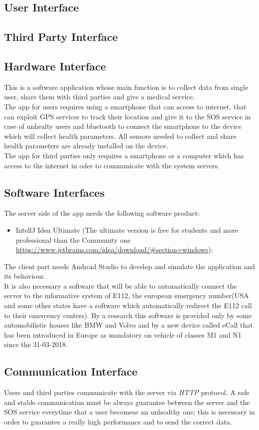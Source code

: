 \subsection{User Interface}


\subsection{Third Party Interface}


\subsection{Hardware Interface}
This is a software application whose main function is to collect data from single user, share them with third parties and give a medical service.\\
The app for users requires using a smartphone that can access to internet, that can exploit GPS services to track their location and give it to the SOS service in case of unhealty users and bluetooth to connect the smartphone to the device which will collect health parameters.
All sensors needed to collect and share health parameters are already installed on the device.\\
The app for third parties only requires a smartphone or a computer which has access to the internet in oder to communicate with the system servers.


\subsection{Software Interfaces}
The server side of the app needs the following software product:
\begin{itemize}
	\item IntellJ Idea Ultimate (The ultimate version is free for students and more professional than the Community one \url{https://www.jetbrains.com/idea/download/#section=windows});
\end{itemize}
The client part needs Android Studio to develop and simulate the application and its behaviour.\\
It is also necessary a software that will be able to automatically connect the server to the informative system of E112, the european emergency number(USA and some other states have a software which automatically redirect the E112 call to their emercency centers). By a research this software is provided only by some automobilistic houses like BMW and Volvo and by a new device called eCall that has been introduced in Europe as mandatory on vehicle of classes M1 and N1 since the 31-03-2018.


\subsection{Communication Interface}
Users and third parties communicate with the server via \textit{HTTP} protocol.
A safe and stable communication must be always guarantee between the server and the SOS service everytime that a user becomese an unhealthy one; this is necessary in order to guarantee a really high performance and to send the correct data.
